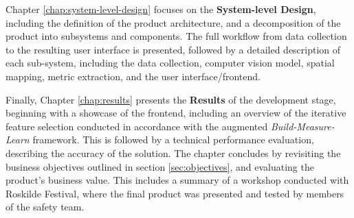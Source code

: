 Chapter \ref{chap:system-level-design} focuses on the \textbf{System-level Design}, including the definition of the product architecture, and a decomposition of the product into subsystems and components. The full workflow from data collection to the resulting user interface is presented, followed by a detailed description of each sub-system, including the data collection, computer vision model, spatial mapping, metric extraction, and the user interface/frontend.

Finally, Chapter \ref{chap:results} presents the \textbf{Results} of the development stage, beginning with a showcase of the frontend, including an overview of the iterative feature selection conducted in accordance with the augmented \textit{Build-Measure-Learn} framework. This is followed by a technical performance evaluation, describing the accuracy of the solution. The chapter concludes by revisiting the business objectives outlined in section \ref{sec:objectives}, and evaluating the product's business value. This includes a summary of a workshop conducted with Roskilde Festival, where the final product was presented and tested by members of the safety team.